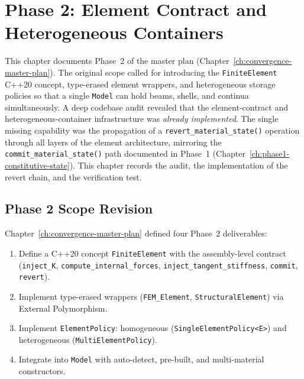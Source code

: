 
\chapter{Phase 2: Element Contract and Heterogeneous Containers}
\label{ch:phase2-element-contract}

This chapter documents Phase~2 of the master plan
(Chapter~\ref{ch:convergence-master-plan}).  The original scope called
for introducing the \texttt{FiniteElement} C++20 concept, type-erased
element wrappers, and heterogeneous storage policies so that a single
\texttt{Model} can hold beams, shells, and continua simultaneously.
A deep codebase audit revealed that the element-contract and
heterogeneous-container infrastructure was \emph{already implemented}.
The single missing capability was the propagation of a
\texttt{revert\_material\_state()} operation through all layers of the
element architecture, mirroring the \texttt{commit\_material\_state()}
path documented in Phase~1 (Chapter~\ref{ch:phase1-constitutive-state}).
This chapter records the audit, the implementation of the revert chain,
and the verification test.

\section{Phase 2 Scope Revision}
\label{sec:phase2-scope-revision}

Chapter~\ref{ch:convergence-master-plan} defined four Phase~2
deliverables:

\begin{enumerate}
  \item Define a C++20 concept \texttt{FiniteElement} with the
        assembly-level contract (\texttt{inject\_K},
        \texttt{compute\_internal\_forces},
        \texttt{inject\_tangent\_stiffness}, \texttt{commit},
        \texttt{revert}).
  \item Implement type-erased wrappers (\texttt{FEM\_Element},
        \texttt{StructuralElement}) via External Polymorphism.
  \item Implement \texttt{ElementPolicy}: homogeneous
        (\texttt{SingleElementPolicy<E>}) and heterogeneous
        (\texttt{MultiElementPolicy}).
  \item Integrate into \texttt{Model} with auto-detect, pre-built,
        and multi-material constructors.
\end{enumerate}

